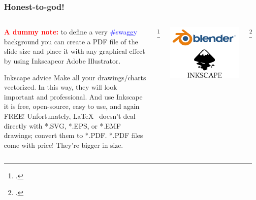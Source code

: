 \documentclass{EESD}
\begin{document}
\begin{frame}
\frametitle{Honest-to-god!}
\begin{columns}
    \begin{column}{0.7\textwidth}
    \textcolor{red}{\textbf{A dummy note:}} to define a very \textcolor{blue}{\#swaggy} background you can create a PDF file of the slide size and place it with any graphical effect by using Inkscape\footnotemark or Adobe Illustrator.
    \begin{block}{Inkscape advice}
        Make all your drawings/charts vectorized. In this way, they will look important and professional. And use Inkscape it is free, open-source, easy to use, and again FREE! Unfortunately, \LaTeX~ doesn't deal directly with *.SVG, *.EPS, or *.EMF drawings; convert them to *.PDF. *.PDF files come with price! They're bigger in size.
    \end{block}
    \end{column}
    \footcitetext{Inkscape}
    \begin{column}{0.30\textwidth}
        \vspace{0.7cm}
        \includegraphics[height=0.3\textheight]{Blender_Inkscape.pdf}
    \end{column}
    \footcitetext{REF:30}
\end{columns}
\end{frame}
\end{document}
